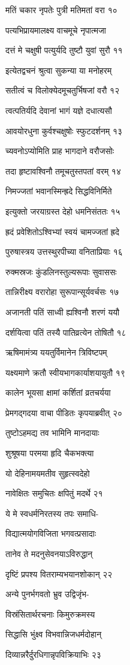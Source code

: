 मतिं चकार नृपतेः पुत्री मतिमतां वरा १०

पत्यभिप्रायमालक्ष्य वाचमूचे नृपात्मजा

दत्तं मे चक्षुषी पत्युर्यदि तुष्टौ युवां सुरौ ११

इत्येतद्वचनं श्रुत्वा सुकन्या या मनोहरम्

सतीत्वं च विलोक्येदमूचतुर्भिषजां वरौ १२

त्वत्पतिर्यदि देवानां भागं यज्ञे दधात्यसौ

आवयोरधुना कुर्वश्चक्षुषोः स्फुटदर्शनम् १३

च्यवनोऽप्योमिति प्राह भागदाने वरौजसोः

तदा हृष्टावश्विनौ तमूचतुस्तपतां वरम् १४

निमज्जतां भवानस्मिन्ह्रदे सिद्धविनिर्मिते

इत्युक्तो जरयाग्रस्त देहो धमनिसंततः १५

ह्रदं प्रवेशितोऽश्विभ्यां स्वयं चामज्जतां ह्रदे

पुरुषास्त्रय उत्तस्थुरपीच्या वनिताप्रियाः १६

रुक्मस्रजः कुंडलिनस्तुल्यरूपाः सुवाससः

तान्निरीक्ष्य वरारोहा सुरूपान्सूर्यवर्चसः १७

अजानती पतिं साध्वी ह्यश्विनौ शरणं ययौ

दर्शयित्वा पतिं तस्यै पातिव्रत्येन तोषितौ १८

ऋषिमामंत्र्य ययतुर्विमानेन त्रिविष्टपम्

यक्ष्यमाणे क्रतौ स्वीयभागकार्याशयायुतौ १९

कालेन भूयसा क्षामां कर्शितां व्रतचर्यया

प्रेमगद्गदया वाचा पीडितः कृपयाब्रवीत् २०

तुष्टोऽहमद्य तव भामिनि मानदायाः

शुश्रूषया परमया हृदि चैकभक्त्या

यो देहिनामयमतीव सुहृत्स्वदेहो

नावेक्षितः समुचितः क्षपितुं मदर्थे २१

ये मे स्वधर्मनिरतस्य तपः समाधि-

विद्यात्मयोगविजिता भगवत्प्रसादाः

तानेव ते मदनुसेवनयाऽविरुद्धान्

दृष्टिं प्रपश्य वितराम्यभयानशोकान् २२

अन्ये पुनर्भगवतो भ्रुव उद्विजृंभ-

विस्रंसितार्थरचनाः किमुरुक्रमस्य

सिद्धासि भुंक्ष्व विभवान्निजधर्मदोहान्

दिव्यान्नरैर्दुरधिगान्नृपविक्रियाभिः २३

